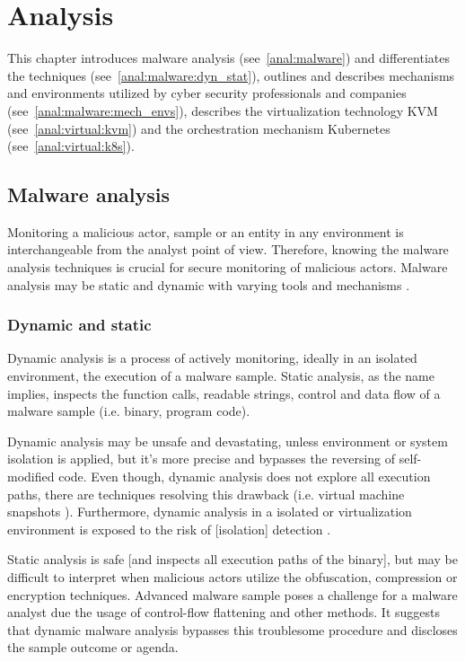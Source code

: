 \chapter{Analysis \label{anal}}
This chapter introduces malware analysis (see~\autoref{anal:malware}) and differentiates the techniques (see~\autoref{anal:malware:dyn_stat}), outlines and describes mechanisms and environments utilized by cyber security professionals and companies (see~\autoref{anal:malware:mech_envs}), describes the virtualization technology KVM (see~\autoref{anal:virtual:kvm}) and the orchestration mechanism Kubernetes (see~\autoref{anal:virtual:k8s}).

\section{Malware analysis \label{anal:malware}}
Monitoring a malicious actor, sample or an entity in any environment is interchangeable from the analyst point of view. Therefore, knowing the malware analysis techniques is crucial for secure monitoring of malicious actors. Malware analysis may be static and dynamic with varying tools and mechanisms \cite{article:malware_analysis_techniques} \cite{research:malware_analysis_2017}.

\subsection{Dynamic and static \label{anal:malware:dyn_stat}}
Dynamic analysis is a process of actively monitoring, ideally in an isolated environment, the execution of a malware sample. Static analysis, as the name implies, inspects the function calls, readable strings, control and data flow of a malware sample (i.e. binary, program code).

Dynamic analysis may be unsafe and devastating, unless environment or system isolation is applied, but it's more precise and bypasses the reversing of self-modified code. Even though, dynamic analysis does not explore all execution paths, there are techniques resolving this drawback (i.e. virtual machine snapshots \cite{research:malware_analysis_2017}). Furthermore, dynamic analysis in a isolated or virtualization environment is exposed to the risk of [isolation] detection \cite{medium_article:malware_analysis_sandboxing}.

Static analysis is safe [and inspects all execution paths of the binary], but may be difficult to interpret when malicious actors utilize the obfuscation, compression or encryption techniques. Advanced malware sample poses a challenge for a malware analyst due the usage of control-flow flattening \cite{report:eset_static_analysis} and other methods. It suggests that dynamic malware analysis bypasses this troublesome procedure and discloses the sample outcome or agenda.

